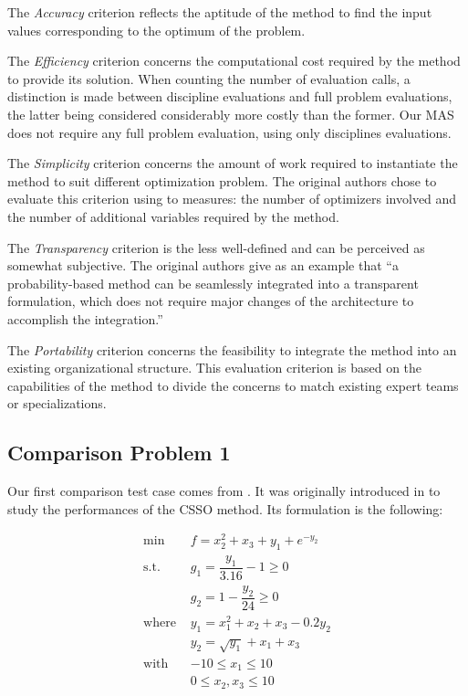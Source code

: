 The \emph{Accuracy} criterion reflects the aptitude of the method to find the input values corresponding to the optimum of the problem.
 
The \emph{Efficiency} criterion concerns the computational cost required by the method to provide its solution. When counting the number of evaluation calls, a distinction is made between discipline evaluations and full problem evaluations, the latter being considered considerably more costly than the former. Our MAS does not require any full problem evaluation, using only disciplines evaluations.
 
The \emph{Simplicity} criterion concerns the amount of work required to instantiate the method to suit different optimization problem. The original authors chose to evaluate this criterion using to measures: the number of optimizers involved and the number of additional variables required by the method.

The \emph{Transparency} criterion is the less well-defined and can be perceived as somewhat subjective. The original authors give as an example that \enquote{a probability-based method can be seamlessly integrated into a transparent formulation, which does not require major changes of the architecture to accomplish the integration.}

The \emph{Portability} criterion concerns the feasibility to integrate the method into an existing organizational structure. This evaluation criterion is based on the capabilities of the method to divide the concerns to match existing expert teams or specializations.

\subsection{Comparison Problem 1}

Our first comparison test case comes from \cite{perez2004evaluation}. It was originally introduced in \cite{sellar1996response} to study the performances of the CSSO method. Its formulation is the following:

\begin{align*}
\text{min }		&	f =x_2^2 + x_3 + y_1 + e^{-y_2}\\
\text{s.t. }			&	g_1 = \dfrac{y_1}{3.16} - 1 \geq 0\\ 
							&	g_2 = 1 - \dfrac{y_2}{24} \geq 0\\
\text{where }	&	y_1 = x_1^2 + x_2 + x_3 - 0.2y_2\\
							&	y_2 = \sqrt{y_1} + x_1 + x_3\\
\text{with }		& -10 \leq x_1 \leq 10\\
							& 0 \leq x_2, x_3 \leq 10
\end{align*}

